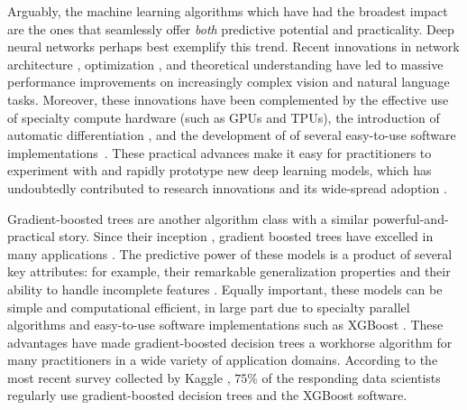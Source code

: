 Arguably, the machine learning algorithms which have had the broadest impact are the ones that seamlessly offer \emph{both} predictive potential and practicality.
Deep neural networks perhaps best exemplify this trend.
Recent innovations in
network architecture \citep[e.g.][]{krizhevsky2012imagenet,he2016deep,vaswani2017attention,devlin2018bert,huang2019convolutional},
optimization \citep[e.g.][]{hochreiter1997flat,ioffe2015batch,izmailov2018averaging},
and theoretical understanding \citep[e.g.][]{keskar2016large,jacot2018neural,arora2019fine}
have led to massive performance improvements on increasingly complex vision and natural language tasks.
Moreover, these innovations have been complemented by
the effective use of specialty compute hardware (such as GPUs and TPUs),
the introduction of automatic differentiation \citep[e.g.][]{paszke2017automatic},
and the development of of several easy-to-use software implementations~\citep[e.g.][]{jia2014caffe,chen2015mxnet,abadi2016tensorflow,paszke2019pytorch}.
These practical advances make it easy for practitioners to experiment with and rapidly prototype new deep learning models, which has undoubtedly contributed to research innovations and its wide-spread adoption \cite{goodfellow2016deep}.

Gradient-boosted trees are another algorithm class with a similar powerful-and-practical story.
Since their inception \cite{friedman2001greedy,friedman2002stochastic}, gradient boosted trees have excelled in many applications \citep[e.g.][]{richardson2007predicting,burges2010ranknet,li2010robust}.
The predictive power of these models is a product of several key attributes: for example, their remarkable generalization properties \citep{freund1997decision,schapire2013boosting} and their ability to handle incomplete features \cite{friedman2001greedy}.
Equally important, these models can be simple and computational efficient, in large part due to specialty parallel algorithms \citep[e.g.][]{panda2009planet,tyree2011parallel,ke2017lightgbm} and easy-to-use software implementations such as XGBoost \cite{chen2016xgboost}.
These advantages have made gradient-boosted decision trees a workhorse algorithm for many practitioners in a wide variety of application domains.
According to the most recent survey collected by Kaggle \cite{kaggle2019kaggle}, $75\%$ of the responding data scientists regularly use gradient-boosted decision trees and the XGBoost software.

